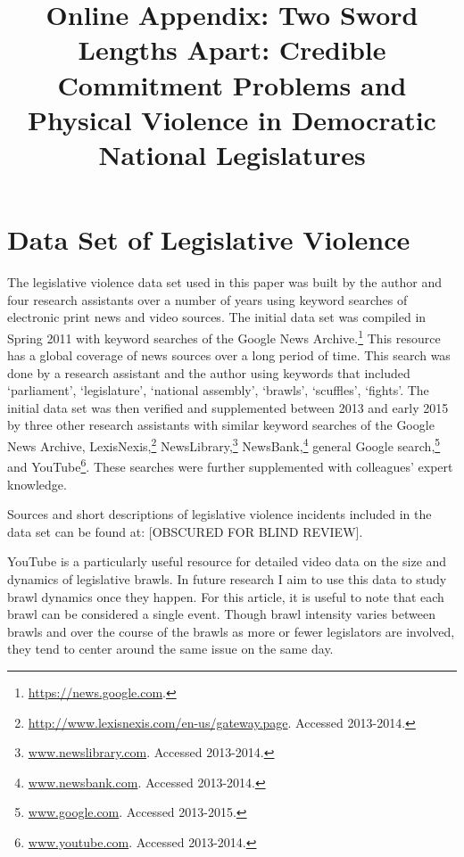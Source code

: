 \documentclass[a4paper]{article}\usepackage[]{graphicx}\usepackage[]{color}
\title{Online Appendix: Two Sword Lengths Apart: Credible Commitment Problems and Physical Violence in Democratic National Legislatures}
\begin{document}
\maketitle



\section*{Data Set of Legislative Violence}


The legislative violence data set used in this paper was built by the author and four research assistants over a number of years using keyword searches of electronic print news and video sources. The initial data set was compiled in Spring 2011 with keyword searches of the Google News Archive.\footnote{\url{https://news.google.com}.} This resource has a global coverage of news sources over a long period of time. This search was done by a research assistant and the author using keywords that included `parliament', `legislature', `national assembly', `brawls', `scuffles', `fights'. The initial data set was then verified and supplemented between 2013 and early 2015 by three other research assistants with similar keyword searches of the Google News Archive, LexisNexis,\footnote{\url{http://www.lexisnexis.com/en-us/gateway.page}. Accessed 2013-2014.} NewsLibrary,\footnote{\url{www.newslibrary.com}. Accessed 2013-2014.} NewsBank,\footnote{\url{www.newsbank.com}. Accessed 2013-2014.} general Google search,\footnote{\url{www.google.com}. Accessed 2013-2015.} and YouTube\footnote{\url{www.youtube.com}. Accessed 2013-2014.}. These searches were further supplemented with colleagues' expert knowledge.

Sources and short descriptions of legislative violence incidents included in the data set can be found at:
[OBSCURED FOR BLIND REVIEW].

YouTube is a particularly useful resource for detailed video data on the size and dynamics of legislative brawls. In future research I aim to use this data to study brawl dynamics once they happen. For this article, it is useful to note that each brawl can be considered a single event. Though brawl intensity varies between brawls and over the course of the brawls as more or fewer legislators are involved, they tend to center around the same issue on the same day.
\end{document}
